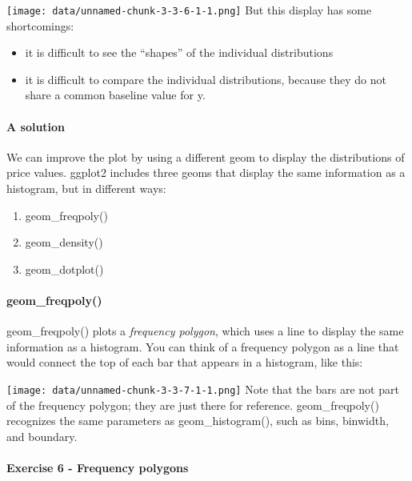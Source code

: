 \documentclass[
]{article}
\providecommand{\tightlist}{%
  \setlength{\itemsep}{0pt}\setlength{\parskip}{0pt}}
\begin{document}
\texttt{[image: data/unnamed-chunk-3-3-6-1-1.png]} But this display has
some shortcomings:

\begin{itemize}
\tightlist
\item
  it is difficult to see the ``shapes'' of the individual distributions
\item
  it is difficult to compare the individual distributions, because they
  do not share a common baseline value for y.
\end{itemize}

\hypertarget{a-solution}{%
\paragraph{A solution}\label{a-solution}}

We can improve the plot by using a different geom to display the
distributions of price values. ggplot2 includes three geoms that display
the same information as a histogram, but in different ways:

\begin{enumerate}
\def\labelenumi{\arabic{enumi}.}
\tightlist
\item
  geom\_freqpoly()
\item
  geom\_density()
\item
  geom\_dotplot()
\end{enumerate}

\hypertarget{geom_freqpoly}{%
\paragraph{geom\_freqpoly()}\label{geom_freqpoly}}

geom\_freqpoly() plots a \emph{frequency polygon}, which uses a line to
display the same information as a histogram. You can think of a
frequency polygon as a line that would connect the top of each bar that
appears in a histogram, like this:

\texttt{[image: data/unnamed-chunk-3-3-7-1-1.png]} Note that the bars
are not part of the frequency polygon; they are just there for
reference. geom\_freqpoly() recognizes the same parameters as
geom\_histogram(), such as bins, binwidth, and boundary.

\hypertarget{exercise-6---frequency-polygons}{%
\paragraph{Exercise 6 - Frequency
polygons}\label{exercise-6---frequency-polygons}}
\end{document}
